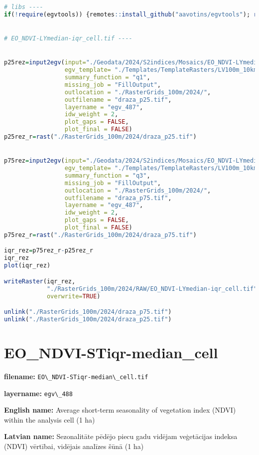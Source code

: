 \documentclass[
]{book}
\newcommand{\passthrough}[1]{#1}
\begin{document}
\begin{lstlisting}[language=R]
# libs ----
if(!require(egvtools)) {remotes::install_github("aavotins/egvtools"); require(egvtools)}


# EO_NDVI-LYmedian-iqr_cell.tif ----


p25rez=input2egv(input="./Geodata/2024/S2indices/Mosaics/EO_NDVI-LYmedian.tif",
                 egv_template= "./Templates/TemplateRasters/LV100m_10km.tif",
                 summary_function = "q1",
                 missing_job = "FillOutput",
                 outlocation = "./RasterGrids_100m/2024/",
                 outfilename = "draza_p25.tif",
                 layername = "egv_487",
                 idw_weight = 2,
                 plot_gaps = FALSE,
                 plot_final = FALSE)
p25rez_r=rast("./RasterGrids_100m/2024/draza_p25.tif")


p75rez=input2egv(input="./Geodata/2024/S2indices/Mosaics/EO_NDVI-LYmedian.tif",
                 egv_template= "./Templates/TemplateRasters/LV100m_10km.tif",
                 summary_function = "q3",
                 missing_job = "FillOutput",
                 outlocation = "./RasterGrids_100m/2024/",
                 outfilename = "draza_p75.tif",
                 layername = "egv_487",
                 idw_weight = 2,
                 plot_gaps = FALSE,
                 plot_final = FALSE)
p75rez_r=rast("./RasterGrids_100m/2024/draza_p75.tif")

iqr_rez=p75rez_r-p25rez_r
iqr_rez
plot(iqr_rez)

writeRaster(iqr_rez,
            "./RasterGrids_100m/2024/RAW/EO_NDVI-LYmedian-iqr_cell.tif",
            overwrite=TRUE)

unlink("./RasterGrids_100m/2024/draza_p75.tif")
unlink("./RasterGrids_100m/2024/draza_p25.tif")
\end{lstlisting}

\section{EO\_NDVI-STiqr-median\_cell}\label{ch06.488}

\textbf{filename:} \passthrough{\lstinline!EO\_NDVI-STiqr-median\_cell.tif!}

\textbf{layername:} \passthrough{\lstinline!egv\_488!}

\textbf{English name:} Average short-term seasonality of vegetation index (NDVI) within the analysis cell (1 ha)

\textbf{Latvian name:} Sezonalitāte pēdējo piecu gadu vidējam veģetācijas indeksa (NDVI) vērtībai, vidējais analīzes šūnā (1 ha)
\end{document}
